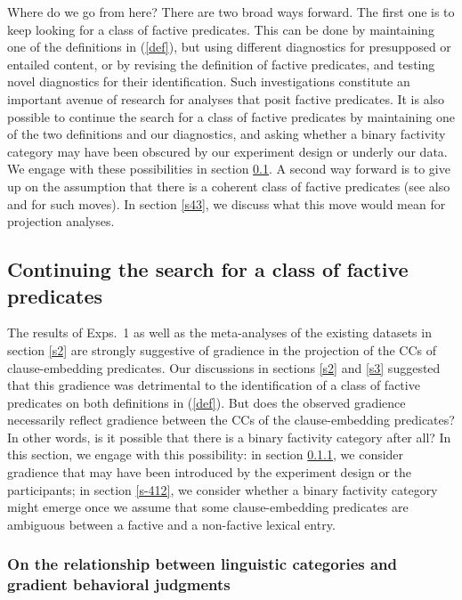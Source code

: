 \documentclass[11pt,fleqn]{article}
\newcommand{\6}{\mbox{$[\hspace*{-.6mm}[$}}
\newcommand{\9}{\mbox{$]\hspace*{-.6mm}]$}}
\begin{document}
Where do we go from here? There are two broad ways forward. The first one is to keep looking for a class of factive predicates. This can be done by maintaining one of the definitions in (\ref{def}), but using different diagnostics for presupposed or entailed content, or by revising the definition of factive predicates, and testing novel diagnostics for their identification. Such investigations constitute an important avenue of research for analyses that posit factive predicates. It is also possible to continue the search for a class of factive predicates by maintaining one of the two definitions and our diagnostics, and asking whether a binary factivity category may have been obscured by our experiment design or underly our data. We engage with these possibilities in section \ref{s41}. A second way forward is to give up on the assumption that there is a coherent class of factive predicates (see also \citealt{karttunen2016} and \citealt{djaerv-thesis} for such moves). In section \ref{s43}, we discuss what this move would mean for projection analyses.

\subsection{Continuing the search for a class of factive predicates}\label{s41}

The results of Exps.~1 as well as the meta-analyses of the existing datasets in section \ref{s2} are strongly suggestive of gradience in the projection of the CCs of clause-embedding predicates. Our discussions in sections \ref{s2} and \ref{s3} suggested that this gradience was detrimental to the identification of a class of factive predicates on both definitions in (\ref{def}). But does the observed gradience necessarily reflect gradience between the CCs of the clause-embedding predicates? In other words, is it possible that there is a binary factivity category after all? In this section, we engage with this possibility: in section \ref{s-411}, we consider gradience that may have been introduced by the experiment design or the participants; in section \ref{s-412}, we consider whether a binary factivity category might emerge once we assume that some clause-embedding predicates are ambiguous between a factive and a non-factive lexical entry. 

\subsubsection{On the relationship between linguistic categories and gradient behavioral judgments}\label{s-411}
\end{document}
